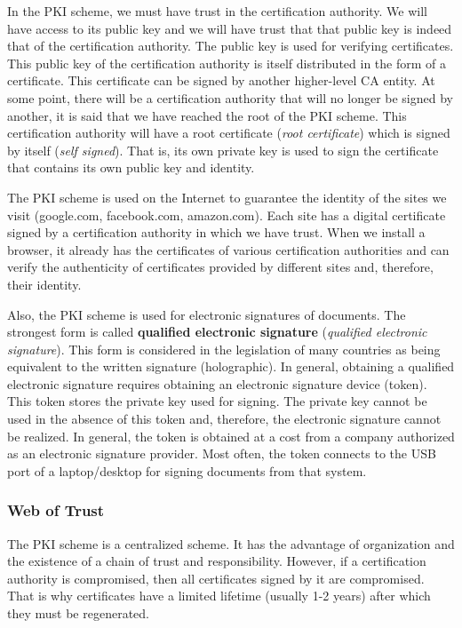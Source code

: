 In the PKI scheme, we must have trust in the certification authority.
We will have access to its public key and we will have trust that that public key is indeed that of the certification authority.
The public key is used for verifying certificates.
This public key of the certification authority is itself distributed in the form of a certificate.
This certificate can be signed by another higher-level CA entity.
At some point, there will be a certification authority that will no longer be signed by another, it is said that we have reached the root of the PKI scheme.
This certification authority will have a root certificate (\textit{root certificate}) which is signed by itself (\textit{self signed}).
That is, its own private key is used to sign the certificate that contains its own public key and identity.

The PKI scheme is used on the Internet to guarantee the identity of the sites we visit (google.com, facebook.com, amazon.com).
Each site has a digital certificate signed by a certification authority in which we have trust.
When we install a browser, it already has the certificates of various certification authorities and can verify the authenticity of certificates provided by different sites and, therefore, their identity.

Also, the PKI scheme is used for electronic signatures of documents.
The strongest form is called \textbf{qualified electronic signature} (\textit{qualified electronic signature}).
This form is considered in the legislation of many countries as being equivalent to the written signature (holographic).
In general, obtaining a qualified electronic signature requires obtaining an electronic signature device (token).
This token stores the private key used for signing.
The private key cannot be used in the absence of this token and, therefore, the electronic signature cannot be realized.
In general, the token is obtained at a cost from a company authorized as an electronic signature provider.
Most often, the token connects to the USB port of a laptop/desktop for signing documents from that system.

\subsubsection{Web of Trust}
\label{sec:sec:transfer:sign:wot}

The PKI scheme is a centralized scheme.
It has the advantage of organization and the existence of a chain of trust and responsibility.
However, if a certification authority is compromised, then all certificates signed by it are compromised.
That is why certificates have a limited lifetime (usually 1-2 years) after which they must be regenerated.

